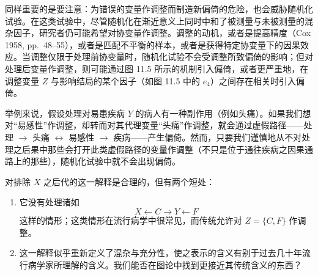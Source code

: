同样重要的是要注意：为错误的变量作调整而制造新偏倚的危险，也会威胁随机化试验。在这类试验中，尽管随机化在渐近意义上同时中和了被测量与未被测量的混杂因子，研究者仍可能希望对协变量作调整。调整的动机，或者是提高精度（Cox 1958, pp.~48--55），或者是匹配不平衡的样本，或者是获得特定协变量下的因果效应。当调整仅限于处理前协变量时，随机化试验不会受调整所致偏倚的影响；但对处理后变量作调整，则可能通过图 11.5 所示的机制引入偏倚，或者更严重地，在调整变量 $Z$ 与影响结局的某个因子（如图 11.5 中的 $e_4$）之间存在相关时引入偏倚。

举例来说，假设处理对易患疾病 $Y$ 的病人有一种副作用（例如头痛）。如果我们想对“易感性”作调整，却转而对其代理变量“头痛”作调整，就会通过虚假路径——处理 $\to$ 头痛 $\leftrightarrow$ 易感性 $\to$ 疾病——产生偏倚。然而，只要我们谨慎地从不对处理之后果中那些会打开此类虚假路径的变量作调整（不只是位于通往疾病之因果通路上的那些），随机化试验中就不会出现偏倚。


对排除 $X$ 之后代的这一解释是合理的，但有两个短处：

\begin{enumerate}[label=\arabic*.]
\item 它没有处理诸如
\[
X\leftarrow C\to Y\leftarrow F
\]
这样的情形；这类情形在流行病学中很常见，而传统允许对 $Z=\{C,F\}$ 作调整。
\item 这一解释似乎重新定义了混杂与充分性，使之表示的含义有别于过去几十年流行病学家所理解的含义。我们能否在图论中找到更接近其传统含义的东西？
\end{enumerate}


